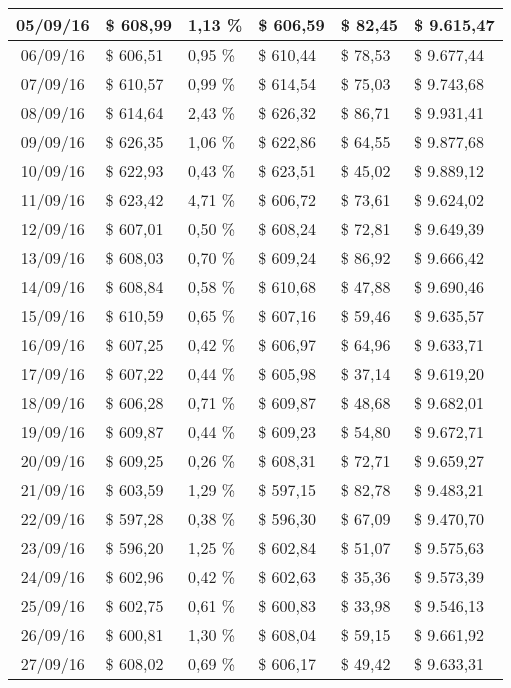 \begin{small}
\begin{longtable}{|c|l|l|l|l|l|}
05/09/16 & \$ 608,99 & 1,13 \% & \$ 606,59 & \$ 82,45 & \$ 9.615,47 \\ \hline
06/09/16 & \$ 606,51 & 0,95 \% & \$ 610,44 & \$ 78,53 & \$ 9.677,44 \\ \hline
07/09/16 & \$ 610,57 & 0,99 \% & \$ 614,54 & \$ 75,03 & \$ 9.743,68 \\ \hline
08/09/16 & \$ 614,64 & 2,43 \% & \$ 626,32 & \$ 86,71 & \$ 9.931,41 \\ \hline
09/09/16 & \$ 626,35 & 1,06 \% & \$ 622,86 & \$ 64,55 & \$ 9.877,68 \\ \hline
10/09/16 & \$ 622,93 & 0,43 \% & \$ 623,51 & \$ 45,02 & \$ 9.889,12 \\ \hline
11/09/16 & \$ 623,42 & 4,71 \% & \$ 606,72 & \$ 73,61 & \$ 9.624,02 \\ \hline
12/09/16 & \$ 607,01 & 0,50 \% & \$ 608,24 & \$ 72,81 & \$ 9.649,39 \\ \hline
13/09/16 & \$ 608,03 & 0,70 \% & \$ 609,24 & \$ 86,92 & \$ 9.666,42 \\ \hline
14/09/16 & \$ 608,84 & 0,58 \% & \$ 610,68 & \$ 47,88 & \$ 9.690,46 \\ \hline
15/09/16 & \$ 610,59 & 0,65 \% & \$ 607,16 & \$ 59,46 & \$ 9.635,57 \\ \hline
16/09/16 & \$ 607,25 & 0,42 \% & \$ 606,97 & \$ 64,96 & \$ 9.633,71 \\ \hline
17/09/16 & \$ 607,22 & 0,44 \% & \$ 605,98 & \$ 37,14 & \$ 9.619,20 \\ \hline
18/09/16 & \$ 606,28 & 0,71 \% & \$ 609,87 & \$ 48,68 & \$ 9.682,01 \\ \hline
19/09/16 & \$ 609,87 & 0,44 \% & \$ 609,23 & \$ 54,80 & \$ 9.672,71 \\ \hline
20/09/16 & \$ 609,25 & 0,26 \% & \$ 608,31 & \$ 72,71 & \$ 9.659,27 \\ \hline
21/09/16 & \$ 603,59 & 1,29 \% & \$ 597,15 & \$ 82,78 & \$ 9.483,21 \\ \hline
22/09/16 & \$ 597,28 & 0,38 \% & \$ 596,30 & \$ 67,09 & \$ 9.470,70 \\ \hline
23/09/16 & \$ 596,20 & 1,25 \% & \$ 602,84 & \$ 51,07 & \$ 9.575,63 \\ \hline
24/09/16 & \$ 602,96 & 0,42 \% & \$ 602,63 & \$ 35,36 & \$ 9.573,39 \\ \hline
25/09/16 & \$ 602,75 & 0,61 \% & \$ 600,83 & \$ 33,98 & \$ 9.546,13 \\ \hline
26/09/16 & \$ 600,81 & 1,30 \% & \$ 608,04 & \$ 59,15 & \$ 9.661,92 \\ \hline
27/09/16 & \$ 608,02 & 0,69 \% & \$ 606,17 & \$ 49,42 & \$ 9.633,31 \\ \hline

\end{longtable}
\end{small}
